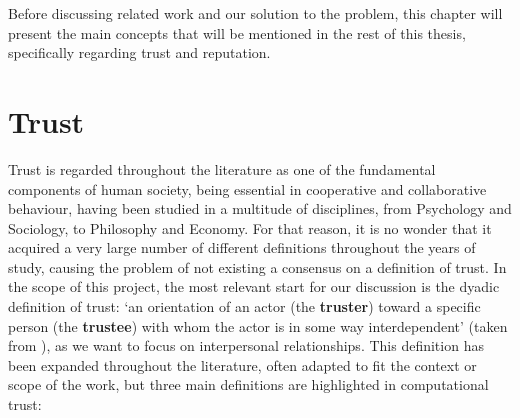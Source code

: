 \label{chap:Background}
Before discussing related work and our solution to the problem, this chapter will present the main concepts that  will be mentioned in the rest of this thesis, specifically regarding trust and reputation.

\section{Trust}
\label{sec:Trust}
Trust is regarded throughout the literature as one of the fundamental components of human society, being essential in cooperative and collaborative behaviour, having been studied in a multitude of disciplines, from Psychology and Sociology, to Philosophy and Economy\cite{Rousseau1998, Jones1997, Sabater2005}. For that reason, it is no wonder that it acquired a very large number of different definitions throughout the years of study, causing the problem of not existing a consensus on a definition of trust\cite{Castelfranchi2010}. In the scope of this project, the most relevant start for our discussion is the dyadic definition of trust: `an orientation of an actor (the \textbf{truster}) toward a specific person (the \textbf{trustee}) with whom the actor is in some way interdependent' (taken from \cite{Simpson2007}), as we want to focus on interpersonal relationships. This definition has been expanded throughout the literature, often adapted to fit the context or scope of the work, but three main definitions are highlighted in computational trust:
